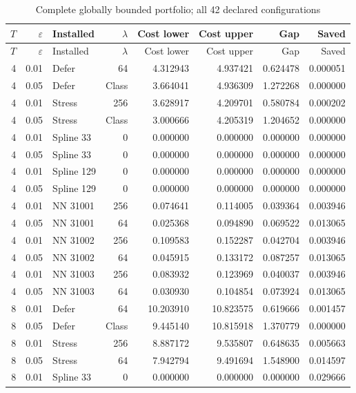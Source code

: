 \begingroup\footnotesize
\setlength{\tabcolsep}{3pt}
\begin{longtable}{rrlrrrrr}
\caption{Complete globally bounded portfolio; all 42 declared configurations}\label{tab:global-all}\\
\toprule $T$ & $\varepsilon$ & Installed & $\lambda$ & Cost lower & Cost upper & Gap & Saved \\ \midrule
\endfirsthead
\toprule $T$ & $\varepsilon$ & Installed & $\lambda$ & Cost lower & Cost upper & Gap & Saved \\ \midrule
\endhead
4 & 0.01 & Defer & 64 & 4.312943 & 4.937421 & 0.624478 & 0.000051 \\
4 & 0.05 & Defer & Class & 3.664041 & 4.936309 & 1.272268 & 0.000000 \\
4 & 0.01 & Stress & 256 & 3.628917 & 4.209701 & 0.580784 & 0.000202 \\
4 & 0.05 & Stress & Class & 3.000666 & 4.205319 & 1.204652 & 0.000000 \\
4 & 0.01 & Spline 33 & 0 & 0.000000 & 0.000000 & 0.000000 & 0.000000 \\
4 & 0.05 & Spline 33 & 0 & 0.000000 & 0.000000 & 0.000000 & 0.000000 \\
4 & 0.01 & Spline 129 & 0 & 0.000000 & 0.000000 & 0.000000 & 0.000000 \\
4 & 0.05 & Spline 129 & 0 & 0.000000 & 0.000000 & 0.000000 & 0.000000 \\
4 & 0.01 & NN 31001 & 256 & 0.074641 & 0.114005 & 0.039364 & 0.003946 \\
4 & 0.05 & NN 31001 & 64 & 0.025368 & 0.094890 & 0.069522 & 0.013065 \\
4 & 0.01 & NN 31002 & 256 & 0.109583 & 0.152287 & 0.042704 & 0.003946 \\
4 & 0.05 & NN 31002 & 64 & 0.045915 & 0.133172 & 0.087257 & 0.013065 \\
4 & 0.01 & NN 31003 & 256 & 0.083932 & 0.123969 & 0.040037 & 0.003946 \\
4 & 0.05 & NN 31003 & 64 & 0.030930 & 0.104854 & 0.073924 & 0.013065 \\
8 & 0.01 & Defer & 64 & 10.203910 & 10.823575 & 0.619666 & 0.001457 \\
8 & 0.05 & Defer & Class & 9.445140 & 10.815918 & 1.370779 & 0.000000 \\
8 & 0.01 & Stress & 256 & 8.887172 & 9.535807 & 0.648635 & 0.005663 \\
8 & 0.05 & Stress & 64 & 7.942794 & 9.491694 & 1.548900 & 0.014597 \\
8 & 0.01 & Spline 33 & 0 & 0.000000 & 0.000000 & 0.000000 & 0.029666 \\

\end{longtable}
